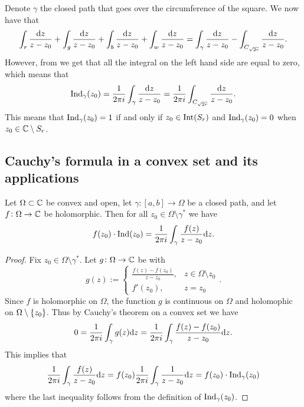 \documentclass[11pt,a4paper]{article}
\begin{document}
\begin{example}
\begin{center}
\end{center}
  Denote $\gamma$ the closed path that goes over the circumference of the
  square.
  We now have that
  \[
    \int_{r} \frac{\mathrm{d} z}{z - z_0} +
    \int_{g} \frac{\mathrm{d} z}{z - z_0} +
    \int_{b} \frac{\mathrm{d} z}{z - z_0} +
    \int_{w} \frac{\mathrm{d} z}{z - z_0} =
    \int_{\gamma} \frac{\mathrm{d} z}{z - z_0} -
    \int_{C_{\sqrt{2r}}} \frac{\mathrm{d} z}{z - z_0}.
  \]
  However, from  we get that all the integral
  on the left hand side are equal to zero, which means that
  \[
    \operatorname{Ind}_{\gamma}(z_0) =
    \frac{1}{2 \pi i} \int_{\gamma} \frac{\mathrm{d} z}{z - z_0} =
    \frac{1}{2 \pi i} \int_{C_{\sqrt{2r}}} \frac{\mathrm{d} z}{z - z_0}.
  \]
  This means that $\operatorname{Ind}_{\gamma}(z_0) = 1$ if and only if $z_0 \in \operatorname{Int}(S_r)$
  and $\operatorname{Ind}_{\gamma}(z_0) = 0$ when $z_0 \in \mathbb{C} \setminus S_r$.
\end{example}

\subsection{Cauchy's formula in a convex set and its applications}
\begin{theorem}
  \label{thm:cauchy-formula}
  Let $\Omega \subset \mathbb{C}$ be convex and open,
  let $\gamma \colon [a,b] \to \Omega$ be a closed path,
  and let $f \colon \Omega \to \mathbb{C}$ be holomorphic.
  Then for all $z_0 \in \Omega \setminus \gamma^*$ we have
  \[
    f(z_0) \cdot \operatorname{Ind}(z_0) =
    \frac{1}{2 \pi i} \int_{\gamma} \frac{f(z)}{z - z_0} \mathrm{d} z.
  \]
\end{theorem}
\begin{proof}
  Fix $z_0 \in \Omega \setminus \gamma^*$.
  Let $g \colon \Omega \to \mathbb{C}$ be with
  \[
    g(z) :=
    \begin{cases}
      \frac{f(z) - f(z_0)}{z - z_0}, & z \in \Omega \setminus{z_0} \\
      f'(z_0), & z = z_0
    \end{cases}.
  \]
  Since $f$ is holomorphic on $\Omega$, the function $g$ is continuous on
  $\Omega$ and holomophic on $\Omega \setminus \left\{z_0\right\}$.
  Thus by Cauchy's theorem on a convex set we have
  \[
    0 =
    \frac{1}{2 \pi i} \int_{\gamma} g(z) \mathrm{d} z =
    \frac{1}{2 \pi i} \int_{\gamma} \frac{f(z) - f(z_0)}{z - z_0} \mathrm{d} z.
  \]
  This implies that
  \[
    \frac{1}{2 \pi i} \int_{\gamma} \frac{f(z)}{z - z_0} \mathrm{d} z =
    f(z_0) \frac{1}{2 \pi i} \int_{\gamma} \frac{1}{z - z_0} \mathrm{d} z =
    f(z_0) \cdot \operatorname{Ind}_{\gamma}(z_0)
  \]
  where the last inequality follows from the definition of
  $\operatorname{Ind}_{\gamma}(z_0)$.
\end{proof}
\end{document}
